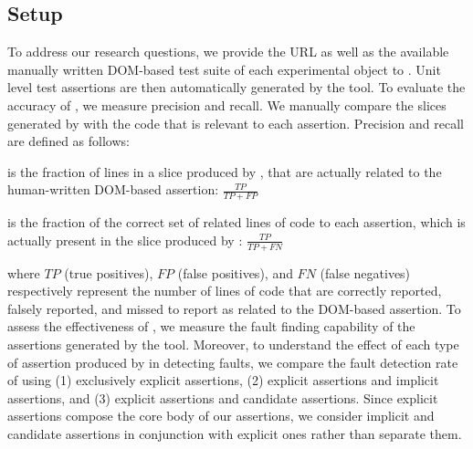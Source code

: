 \subsection{Setup} \label{Sec:setup}
To address our research questions, we provide the URL as well as the available manually written DOM-based test suite of each experimental object to \atrina. Unit level test assertions are then automatically generated by the tool.
 To evaluate the accuracy of \atrina, we measure precision and recall. We manually compare the slices generated by \atrina with the \javascript code that is relevant to each assertion. Precision and recall are defined as follows:
\begin{description}[noitemsep, nolistsep, font=\normalfont\itshape]
\item [Precision] is the fraction of lines in a slice produced by \atrina, that are actually related to the human-written DOM-based assertion: $\frac{TP}{TP+FP}$ 
\item [Recall] is the fraction of the correct set of related lines of code to each assertion, which is actually present in the slice produced by \atrina: $\frac{TP}{TP+FN}$ 
\end{description}
where $TP$ (true positives), $FP$ (false positives), and $FN$ (false negatives) respectively represent the number of lines of code that are correctly reported, falsely reported, and missed to report as related to the DOM-based assertion.
 To assess the effectiveness of \atrina, we measure the fault finding capability of the assertions generated by the tool. Moreover, to understand the effect of each type of assertion produced by \atrina in detecting faults, we compare the fault detection rate of using (1) exclusively explicit assertions, (2) explicit assertions and implicit assertions, and (3) explicit assertions and candidate assertions. Since explicit assertions compose the core body of our assertions, we consider implicit and candidate assertions in conjunction with explicit ones rather than separate them.
       
